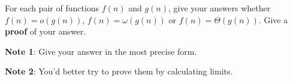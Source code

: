 
For each pair of functions $f(n)$ and $g(n)$, give your answers whether $f(n) = o(g(n))$, $f(n) = \omega(g(n))$ or $f(n) = \Theta(g(n))$.  Give a \textbf{proof} of your answer. 

\textbf{Note 1}: Give your answer in the most precise form. 

\textbf{Note 2}: You'd better try to prove them by calculating limits.


